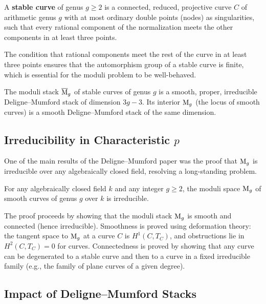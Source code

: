 \begin{definition}
A \textbf{stable curve} of genus \(g \geq 2\) is a connected, reduced, projective curve \(C\) of arithmetic genus \(g\) with at most ordinary double points (nodes) as singularities, such that every rational component of the normalization meets the other components in at least three points.
\end{definition}

The condition that rational components meet the rest of the curve in at least three points ensures that the automorphism group of a stable curve is finite, which is essential for the moduli problem to be well-behaved.

\begin{theorem}
The moduli stack \(\overline{\operatorname{M}}_g\) of stable curves of genus \(g\) is a smooth, proper, irreducible Deligne--Mumford stack of dimension \(3g-3\). Its interior \(\operatorname{M}_g\) (the locus of smooth curves) is a smooth Deligne--Mumford stack of the same dimension.
\end{theorem}

\subsection{Irreducibility in Characteristic \texorpdfstring{\(p\)}{p}}

One of the main results of the Deligne--Mumford paper was the proof that \(\operatorname{M}_g\) is irreducible over any algebraically closed field, resolving a long-standing problem.

\begin{theorem}
For any algebraically closed field \(k\) and any integer \(g \geq 2\), the moduli space \(\operatorname{M}_g\) of smooth curves of genus \(g\) over \(k\) is irreducible.
\end{theorem}

The proof proceeds by showing that the moduli stack \(\operatorname{M}_g\) is smooth and connected (hence irreducible). Smoothness is proved using deformation theory: the tangent space to \(\operatorname{M}_g\) at a curve \(C\) is \(H^1(C, T_C)\), and obstructions lie in \(H^2(C, T_C) = 0\) for curves. Connectedness is proved by showing that any curve can be degenerated to a stable curve and then to a curve in a fixed irreducible family (e.g., the family of plane curves of a given degree).

\subsection{Impact of Deligne--Mumford Stacks}

